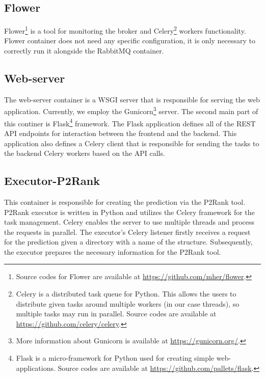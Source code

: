 \subsection{Flower}
\label{subsec:flower}

Flower\footnote{Source codes for Flower are available at \url{https://github.com/mher/flower}.} is a tool for monitoring the broker and Celery\footnote{Celery is a distributed task queue for Python. This allows the users to distribute given tasks around multiple workers (in our case threads), so multiple tasks may run in parallel. Source codes are available at \url{https://github.com/celery/celery}.} workers functionality. Flower container does not need any specific configuration, it is only necessary to correctly run it alongside the RabbitMQ container.

\subsection{Web-server}
\label{subsec:web-server}

The web-server container is a WSGI server that is responsible for serving the web application. Currently, we employ the Gunicorn\footnote{More information about Gunicorn is available at \url{https://gunicorn.org/}.} server. The second main part of this continer is Flask\footnote{Flask is a micro-framework for Python used for creating simple web-applications. Source codes are available at \url{https://github.com/pallets/flask}.} framework. The Flask application defines all of the REST API endpoints for interaction between the frontend and the backend. This application also defines a Celery client that is responsible for sending the tasks to the backend Celery workers based on the API calls.

\subsection{Executor-P2Rank}
\label{subsec:executor-p2rank}

This container is responsible for creating the prediction via the P2Rank tool. P2Rank executor is written in Python and utilizes the Celery framework for the task management. Celery enables the server to use multiple threads and process the requests in parallel. The executor's Celery listener firstly receives a request for the prediction given a directory with a name of the structure. Subsequently, the executor prepares the necessary information for the P2Rank tool.

